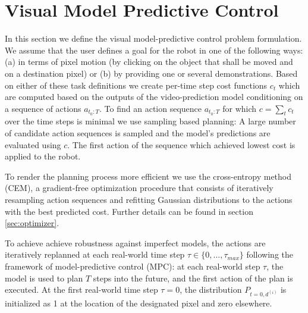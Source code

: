 \section{Visual Model Predictive Control}\label{sec:prelim}
\label{sec:vmpc}

In this section we define the visual model-predictive control problem formulation. We assume that the user defines a goal for the robot in one of the following ways: (a) in terms of pixel motion (by clicking on the object that shall be moved and on a destination pixel) or (b) by providing one or several demonstrations. Based on either of these task definitions we create per-time step cost functions $c_t$ which are computed based on the outputs of the video-prediction model conditioning on a sequence of actions $a_{t_0:T}$. To find an action sequence $a_{t_0:T}$ for which $c = \sum_t{c_t}$ over the time steps is minimal we use sampling based planning: A large number of candidate action sequences is sampled and the model's predictions are evaluated using $c$. The first action of the sequence which achieved lowest cost is applied to the robot.

To render the planning process more efficient we use the cross-entropy method (CEM), a gradient-free optimization procedure that consists of iteratively resampling action sequences and refitting Gaussian distributions to the actions with the best predicted cost. Further details can be found in section \ref{sec:optimizer}.

To achieve achieve robustness against imperfect models, the actions are iteratively replanned at each real-world time step $\tau \in \{0,...,\tau_{max}\}$ following the framework of model-predictive control (MPC): at each real-world step $\tau$, the model is used to plan $T$ steps into the future, and the first action of the plan is executed.
At the first real-world time step $\tau=0$, the distribution $P_{t=0, d^{(i)}} $ is initialized as 1 at the location of the designated pixel and zero elsewhere. 




